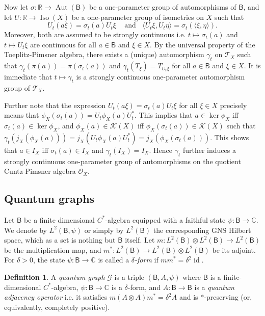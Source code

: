 \documentclass[a4paper,reqno]{amsart}
\numberwithin{equation}{section}
\numberwithin{theorem}{section}
\theoremstyle{definition}\newtheorem{definition}[theorem]{Definition}
\theoremstyle{definition}\newtheorem{remark}[theorem]{Remark}
\theoremstyle{definition}\newtheorem{example}[theorem]{Example}
\theoremstyle{definition}\newtheorem*{notation*}{Notation}
\theoremstyle{definition}\newtheorem*{convention*}{Convention}
\theoremstyle{definition}\newtheorem{observation}{Observation}
\theoremstyle{definition}\newtheorem*{acknowledgment*}{Acknowledgments}
\newcommand{\R}{\mathbb{R}}
\newcommand{\C}{\mathbb{C}}
\newcommand{\B}{\mathsf{B}}
\newcommand{\G}{\mathcal{G}}
\newcommand{\cst}{C^*}
\newcommand{\tx}{\mathcal{T}_X}
\newcommand{\ox}{\mathcal{O}_X}
\DeclareMathOperator{\Aut}{Aut}
\DeclareMathOperator{\Iso}{Iso}
\DeclareMathOperator{\id}{id}
\begin{document}
Now let $\sigma:\R\to   \Aut (\B)$ be a one-parameter group of automorphisms of $\B$, and let $U:\R\to \Iso(X)$ be a one-parameter group of isometries on $X$ such that
\[U_t (a\xi)=\sigma_t(a)U_t\xi\;\;\;\mbox{ and }\;\;\langle U_t\xi, U_t\eta\rangle=\sigma_t(\langle\xi,\eta\rangle).\]
Moreover, both are assumed to be strongly continuous i.e. $t\mapsto\sigma_t(a)$ and $t\mapsto U_t\xi$ are continuous for all $a\in \B$ and $\xi\in X$.
By the universal property of the Toeplitz-Pimsner algebra, there exists a (unique) automorphism $\gamma_t$ on $\tx$ such that $\gamma_t(\pi(a))=\pi(\sigma_t(a))$ and $\gamma_t(T_\xi)=T_{U_t\xi}$
 for all $a\in \B$ and $\xi\in X$. It is immediate that $t\mapsto\gamma_t$ is a strongly continuous one-parameter automorphism group of $\tx$.

 Further note that the expression $U_t(a\xi)=\sigma_t(a)U_t\xi$ for all $\xi\in X$ precisely means that  $\phi_X(\sigma_t(a))=U_t\phi_X(a)U_t^*$. This implies that $a\in \ker\phi_X$ iff $\sigma_t(a)\in \ker\phi_X$, and $\phi_X(a)\in \mathcal{K}(X)$ iff $\phi_X(\sigma_t(a))\in \mathcal{K}(X)$ such that $\gamma_t(j_X(\phi_X(a)))=j_X(U_t\phi_X(a)U_t^*)=j_X(\phi_X(\sigma_t(a)))$. This shows that $a\in I_X$ iff $\sigma_t(a)\in I_X$ and $\gamma_t(I_X)=I_X$. Hence $\gamma_t$ further induces a strongly continuous one-parameter group of automorphisms on the quotient Cuntz-Pimsner algebra $\ox$.
 
 
 






\subsection{Quantum graphs}\label{sub:quantum graph}


Let $\B$ be a finite dimensional $\cst$-algebra equipped with a faithful state $\psi:\B\to\C$. We denote by $L^2(\B,\psi)$ or simply by $L^2(\B)$  the corresponding GNS Hilbert space, which as a  set is nothing but $\B$ itself. Let $m:L^2(\B)\otimes L^2(\B)\to L^2(\B)$ be the multiplication map, and $m^*:L^2(\B)\to L^2(\B)\otimes L^2(\B)$ be its adjoint. For $\delta>0$, the state $\psi:\B\to\C$ is called a {\em $\delta$-form} if $mm^*=\delta^2 \id$.


\begin{definition}
    A {\em quantum graph} $\G$ is a triple $(\B, A,\psi)$ where $\B$ is a finite-dimensional $\cst$-algebra, $\psi:\B\to\C$ is a $\delta$-form, and $A:\B\to\B$ is a {\em quantum adjacency operator} i.e. it satisfies $m(A\otimes A)m^*=\delta^2 A$ and is $\ast$-preserving (or, equivalently, completely positive).
\end{definition}
\end{document}
